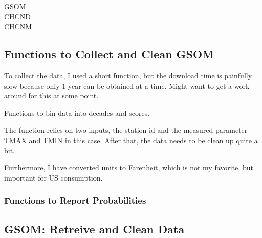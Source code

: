 \documentclass{article}
\begin{document}
\begin{description}
  \item[GSOM]
  \item[CHCND]
  \item[CHCNM]
\end{description}

\subsection{Functions to Collect and Clean GSOM}

To collect the data, I used a short function, but the download time is painfully slow because only 1 year can be obtained at a time. Might want to get a work around for this at some point. 

\begin{knitrout}
\color{fgcolor}\begin{kframe}


{\ttfamily\noindent\bfseries\color{errorcolor}{\#\# Error in substr(GSOM\_Longest\$id, 7, 17): object 'GSOM\_Longest' not found}}\end{kframe}
\end{knitrout}

Functions to bin data into decades and scores. 



The function relies on two inputs, the station id and the measured parameter -- TMAX and TMIN in this case. After that, the data needs to be clean up quite a bit. 

Furthermore, I have converted units to Farenheit, which is not my favorite, but important for US consumption.

\subsubsection{Functions to Report Probabilities}




\subsection{GSOM: Retreive and Clean Data}
\end{document}
